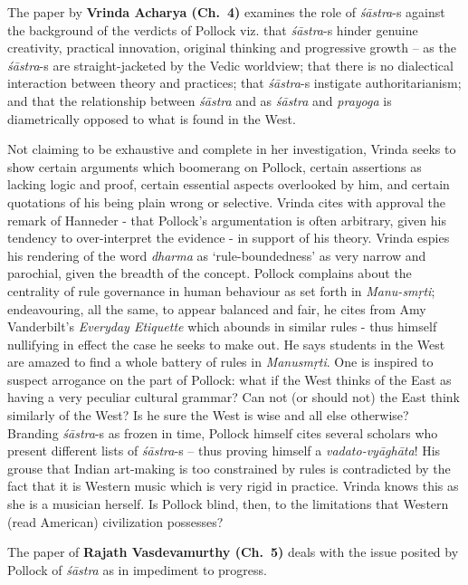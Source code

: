 The paper by {\bf Vrinda Acharya (Ch.~4)} examines the role of {\sl śāstra}-s against the background of the verdicts of Pollock viz. that {\sl śāstra}-s hinder genuine creativity, practical innovation, original thinking and progressive growth -- as the {\sl śāstra}-s are straight-jacketed by the Vedic worldview; that there is no dialectical interaction between theory and practices; that {\sl śāstra}-s instigate authoritarianism; and that the relationship between {\sl śāstra} and as {\sl śāstra} and {\sl prayoga} is diametrically opposed to what is found in the West.

Not claiming to be exhaustive and complete in her investigation, Vrinda seeks to show certain arguments which boomerang on Pollock, certain assertions as lacking logic and proof, certain essential aspects overlooked by him, and certain quotations of his being plain wrong or selective. Vrinda cites with approval the remark of Hanneder - that Pollock’s argumentation is often arbitrary, given his tendency to over-interpret the evidence - in support of his theory. Vrinda espies his rendering of the word {\sl dharma} as ‘rule-boundedness’ as very narrow and parochial, given the breadth of the concept. Pollock complains about the centrality of rule governance in human behaviour as set forth in {\sl Manu-smṛti}; endeavouring, all the same, to appear balanced and fair, he cites from Amy Vanderbilt’s {\sl Everyday Etiquette} which abounds in similar rules - thus himself nullifying in effect the case he seeks to make out. He says students in the West are amazed to find a whole battery of rules in {\sl Manusmṛti}. One is inspired to suspect arrogance on the part of Pollock: what if the West thinks of the East as having a very peculiar cultural grammar? Can not (or should not) the East think similarly of the West? Is he sure the West is wise and all else otherwise? Branding {\sl śāstra}-s as frozen in time, Pollock himself cites several scholars who present different lists of {\sl śāstra}-s -- thus proving himself a {\sl vadato-vyāghāta}! His grouse that Indian art-making is too constrained by rules is contradicted by the fact that it is Western music which is very rigid in practice. Vrinda knows this as she is a musician herself. Is Pollock blind, then, to the limitations that Western (read American) civilization possesses?

The paper of {\bf Rajath Vasdevamurthy (Ch.~5)} deals with the issue posited by Pollock  of {\sl śāstra} as in impediment to progress.

